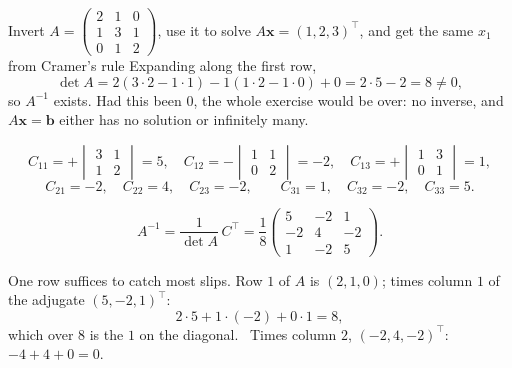 \begin{worked}{Invert $A=\begin{pmatrix}2&1&0\\1&3&1\\0&1&2\end{pmatrix}$, use it to solve $A\mathbf x=(1,2,3)^{\!\top}$, and get the same $x_{1}$ from Cramer's rule}
Expanding along the first row,
\[
  \det A=2(3\cdot2-1\cdot1)-1(1\cdot2-1\cdot0)+0
        =2\cdot5-2=8\neq0 ,
\]
so $A^{-1}$ exists. Had this been $0$, the whole exercise would be over: no
inverse, and $A\mathbf x=\mathbf b$ either has no solution or infinitely
many.

\[
  C_{11}=+\begin{vmatrix}3&1\\1&2\end{vmatrix}=5,\quad
  C_{12}=-\begin{vmatrix}1&1\\0&2\end{vmatrix}=-2,\quad
  C_{13}=+\begin{vmatrix}1&3\\0&1\end{vmatrix}=1,
\]
\[
  C_{21}=-2,\quad C_{22}=4,\quad C_{23}=-2,\qquad
  C_{31}=1,\quad C_{32}=-2,\quad C_{33}=5 .
\]

\[
  A^{-1}=\frac{1}{\det A}\,C^{\!\top}
  =\frac18\begin{pmatrix}5&-2&1\\-2&4&-2\\1&-2&5\end{pmatrix} .
\]

One row suffices to catch most slips. Row $1$ of $A$ is $(2,1,0)$; times
column $1$ of the adjugate $(5,-2,1)^{\!\top}$:
\[
  2\cdot5+1\cdot(-2)+0\cdot1=8 ,
\]
which over $8$ is the $1$ on the diagonal. \checkmark\ Times column $2$,
$(-2,4,-2)^{\!\top}$: $-4+4+0=0$. \checkmark


\end{worked}
